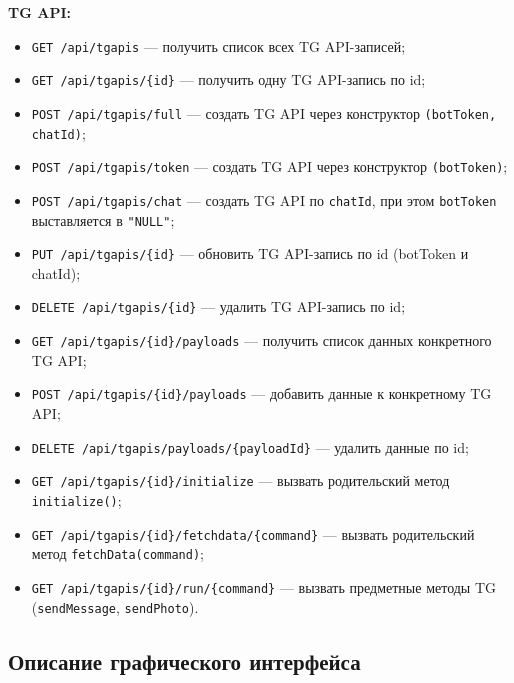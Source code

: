 \documentclass[11pt,a4paper]{article}
\begin{document}
\textbf{TG API:}
\begin{itemize}
    \item \texttt{GET /api/tgapis} --- получить список всех TG API-записей;
    \item \texttt{GET /api/tgapis/\{id\}} --- получить одну TG API-запись по id;
    \item \texttt{POST /api/tgapis/full} --- создать TG API через конструктор \texttt{(botToken, chatId)};
    \item \texttt{POST /api/tgapis/token} --- создать TG API через конструктор \texttt{(botToken)};
    \item \texttt{POST /api/tgapis/chat} --- создать TG API по \texttt{chatId}, при этом \texttt{botToken} выставляется в \texttt{"NULL"};
    \item \texttt{PUT /api/tgapis/\{id\}} --- обновить TG API-запись по id (botToken и chatId);
    \item \texttt{DELETE /api/tgapis/\{id\}} --- удалить TG API-запись по id;
    \item \texttt{GET /api/tgapis/\{id\}/payloads} --- получить список данных конкретного TG API;
    \item \texttt{POST /api/tgapis/\{id\}/payloads} --- добавить данные к конкретному TG API;
    \item \texttt{DELETE /api/tgapis/payloads/\{payloadId\}} --- удалить данные по id;
    \item \texttt{GET /api/tgapis/\{id\}/initialize} --- вызвать родительский метод \texttt{initialize()};
    \item \texttt{GET /api/tgapis/\{id\}/fetchdata/\{command\}} --- вызвать родительский метод \texttt{fetchData(command)};
    \item \texttt{GET /api/tgapis/\{id\}/run/\{command\}} --- вызвать предметные методы TG (\texttt{sendMessage}, \texttt{sendPhoto}).
\end{itemize}

\subsection*{Описание графического интерфейса}
\end{document}

